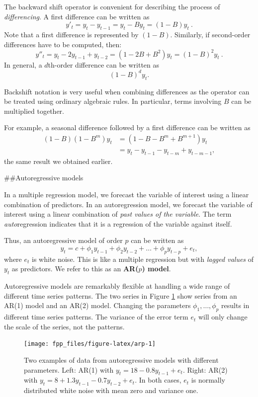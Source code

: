 \documentclass[]{book}
\begin{document}
The backward shift operator is convenient for describing the process of \emph{differencing}. A first difference can be written as
\[
  y'_{t} = y_{t} - y_{t-1} = y_t - By_{t} = (1 - B)y_{t}\: .
\]
Note that a first difference is represented by \((1 - B)\). Similarly, if second-order differences have to be computed, then:
\[
  y''_{t} = y_{t} - 2y_{t - 1} + y_{t - 2} = (1-2B+B^2)y_t = (1 - B)^{2} y_{t}\: .
\]
In general, a \(d\)th-order difference can be written as
\[
  (1 - B)^{d} y_{t}.
\]

Backshift notation is very useful when combining differences as the operator can be treated using ordinary algebraic rules. In particular, terms involving \(B\) can be multiplied together.

For example, a seasonal difference followed by a first difference can be written as
\begin{align*}
(1-B)(1-B^m)y_t &= (1 - B - B^m + B^{m+1})y_t \\
&= y_t-y_{t-1}-y_{t-m}+y_{t-m-1},
\end{align*}
the same result we obtained earlier.

\#\#Autoregressive models

In a multiple regression model, we forecast the variable of interest using a linear combination of predictors. In an autoregression model, we forecast the variable of interest using a linear combination of \emph{past values of the variable}. The term \emph{auto}regression indicates that it is a regression of the variable against itself.

Thus, an autoregressive model of order \(p\) can be written as
\[
  y_{t} = c + \phi_{1}y_{t-1} + \phi_{2}y_{t-2} + \dots + \phi_{p}y_{t-p} + e_{t},
\]
where \(e_t\) is white noise. This is like a multiple regression but with \emph{lagged values} of \(y_t\) as predictors. We refer to this as an \textbf{AR(\(p\)) model}.

Autoregressive models are remarkably flexible at handling a wide range of different time series patterns. The two series in Figure \ref{fig:arp} show series from an AR(1) model and an AR(2) model. Changing the parameters \(\phi_1,\dots,\phi_p\) results in different time series patterns. The variance of the error term \(e_t\) will only change the scale of the series, not the patterns.

\begin{figure}

{\centering \texttt{[image: fpp\_files/figure-latex/arp-1]} 

}

\caption{Two examples of data from autoregressive models with different parameters. Left: AR(1) with $y_t = 18 -0.8y_{t-1} + e_t$. Right: AR(2) with $y_t = 8 + 1.3y_{t-1}-0.7y_{t-2}+e_t$. In both cases, $e_t$ is normally distributed white noise with mean zero and variance one.}\label{fig:arp}
\end{figure}
\end{document}
